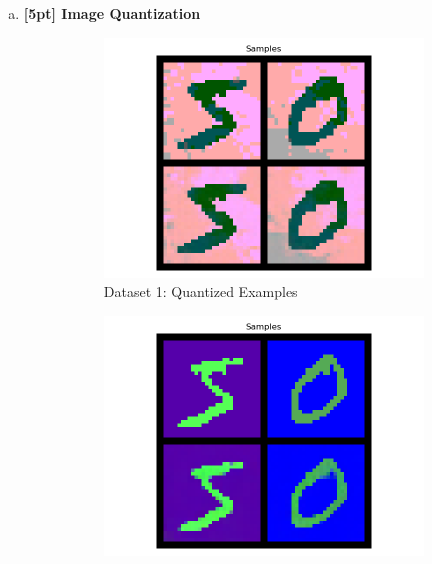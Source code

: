 \documentclass{article}
\begin{document}
\newpage
{}

\begin{enumerate}[(a)]
\item {\bf [5pt] Image Quantization}
\begin{figure}[H]
    \centering
    \begin{subfigure}{0.3\textwidth}
        \centering
        \includegraphics[width=\textwidth]{figures/q4_a_dset1_samples.png}
        \caption{Dataset 1: Quantized Examples}
    \end{subfigure}
    \hspace{0.2in}
    \begin{subfigure}{0.3\textwidth}
        \centering
        \includegraphics[width=\textwidth]{figures/q4_a_dset2_samples.png}

\end{subfigure}
\end{figure}
\end{enumerate}
\end{document}
